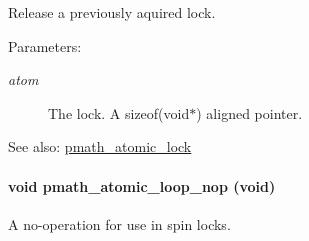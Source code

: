 Release a previously aquired lock. 

\begin{Desc}
\item[Parameters:]
\begin{description}
\item[{\em atom}]The lock. A sizeof(void$\ast$) aligned pointer.\end{description}
\end{Desc}
\begin{Desc}
\item[See also:]\hyperlink{group__atomic__ops_gf143a22332da6a2065bac14069ecbf7f}{pmath\_\-atomic\_\-lock} \end{Desc}
\hypertarget{group__atomic__ops_gf92920164c2e99abfbbe092dfc5dae86}{
\paragraph[{pmath\_\-atomic\_\-loop\_\-nop}]{\setlength{\rightskip}{0pt plus 5cm}void pmath\_\-atomic\_\-loop\_\-nop (void)}\hfill}
\label{group__atomic__ops_gf92920164c2e99abfbbe092dfc5dae86}


A no-operation for use in spin locks. 